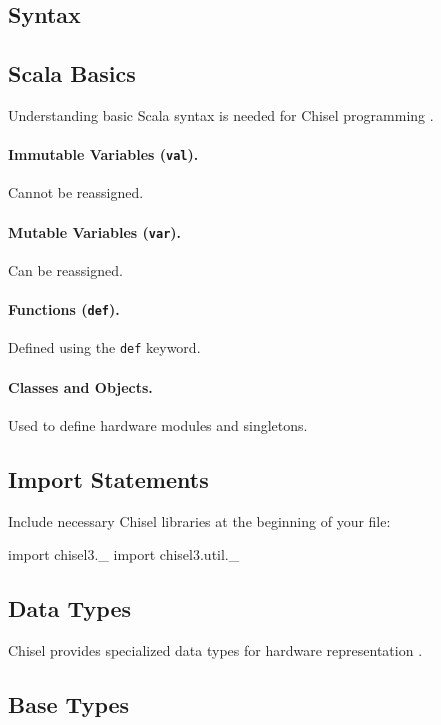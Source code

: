 \subsection{Syntax}

\subsection{Scala Basics}
Understanding basic Scala syntax is needed for Chisel programming \cite{odersky2008programming}.

\paragraph{Immutable Variables (\texttt{val}).} Cannot be reassigned.
\paragraph{Mutable Variables (\texttt{var}).} Can be reassigned.
\paragraph{Functions (\texttt{def}).} Defined using the \texttt{def} keyword.
\paragraph{Classes and Objects.} Used to define hardware modules and singletons.

\subsection{Import Statements}
Include necessary Chisel libraries at the beginning of your file:

\begin{chiselcode}
import chisel3._
import chisel3.util._    
\end{chiselcode}

\subsection{Data Types}
Chisel provides specialized data types for hardware representation \cite{chisel-doc}.

\subsection{Base Types}
